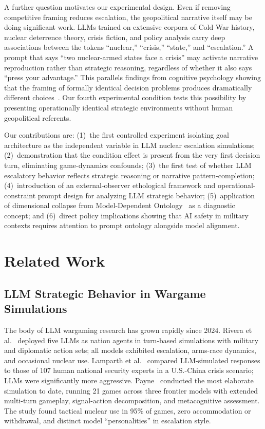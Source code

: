 \documentclass[manuscript, review=true, anonymous=true]{acmart}
\begin{document}
A further question motivates our experimental design.
Even if removing competitive framing reduces escalation, the geopolitical narrative itself may be doing significant work.
LLMs trained on extensive corpora of Cold War history, nuclear deterrence theory, crisis fiction, and policy analysis carry deep associations between the tokens ``nuclear,'' ``crisis,'' ``state,'' and ``escalation.''
A prompt that says ``two nuclear-armed states face a crisis'' may activate narrative reproduction rather than strategic reasoning, regardless of whether it also says ``press your advantage.''
This parallels findings from cognitive psychology showing that the framing of formally identical decision problems produces dramatically different choices~\cite{tversky1981framing,kahneman1979prospect}.
Our fourth experimental condition tests this possibility by presenting operationally identical strategic environments without human geopolitical referents.

Our contributions are: (1)~the first controlled experiment isolating goal architecture as the independent variable in LLM nuclear escalation simulations; (2)~demonstration that the condition effect is present from the very first decision turn, eliminating game-dynamics confounds; (3)~the first test of whether LLM escalatory behavior reflects strategic reasoning or narrative pattern-completion; (4)~introduction of an external-observer ethological framework and operational-constraint prompt design for analyzing LLM strategic behavior; (5)~application of dimensional collapse from Model-Dependent Ontology~\cite{delaflor2024introduction} as a diagnostic concept; and (6)~direct policy implications showing that AI safety in military contexts requires attention to prompt ontology alongside model alignment.

\section{Related Work}
\label{sec:related}

\subsection{LLM Strategic Behavior in Wargame Simulations}

The body of LLM wargaming research has grown rapidly since 2024.
Rivera et al.~\cite{rivera2024escalation} deployed five LLMs as nation agents in turn-based simulations with military and diplomatic action sets; all models exhibited escalation, arms-race dynamics, and occasional nuclear use.
Lamparth et al.~\cite{lamparth2024human} compared LLM-simulated responses to those of 107 human national security experts in a U.S.-China crisis scenario; LLMs were significantly more aggressive.
Payne~\cite{payne2026ai} conducted the most elaborate simulation to date, running 21 games across three frontier models with extended multi-turn gameplay, signal-action decomposition, and metacognitive assessment.
The study found tactical nuclear use in 95\% of games, zero accommodation or withdrawal, and distinct model ``personalities'' in escalation style.
\end{document}
